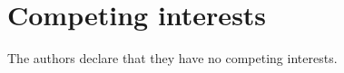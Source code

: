 \documentclass{PL}
\theoremstyle{definition}
\begin{document}



\section*{Competing interests}

The authors declare that they have no competing interests.


\end{document}
